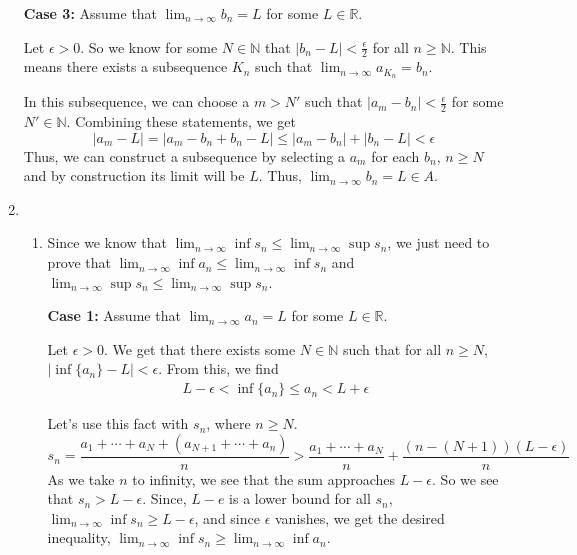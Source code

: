 \documentclass[12pt]{article}
\begin{document}
\begin{enumerate}[start=1,label={\bfseries Problem \arabic*:},leftmargin=1in]
    \textbf{Case 3:} Assume that $\lim_{n \to \infty} b_{n} = L$ for some $L \in \mathbb{R}$. 

    Let $\epsilon > 0$. So we know for some $N \in \mathbb{N}$ that $|b_{n} - L| < \frac{\epsilon}{2}$ for all $n \geq \mathbb{N}$. 
    This means there exists a subsequence $K_{n}$ such that $\lim_{n \to \infty}a_{K_{n}} = b_{n}$. 

    In this subsequence, we can choose a $m > N'$ such that $|a_{m} - b_{n}| < \frac{\epsilon}{2}$ for some $N' \in \mathbb{N}$. 
    Combining these statements, we get 
    \[
        \left| a_{m} - L \right| = \left| a_{m} - b_{n} + b_{n} - L \right| \leq \left| a_{m} - b_{n} \right| + \left| b_{n} - L \right| < \epsilon  
    \]
    Thus, we can construct a subsequence by selecting a $a_{m}$ for each $b_{n}$, $n \geq N$ and by construction its limit will be $L$.
    Thus, $\lim_{n \to \infty} b_{n} = L \in A$. 

    \item 
    \begin{enumerate}
        \item Since we know that $\lim_{n \to \infty} \inf s_{n} \leq \lim_{n \to \infty} \sup s_{n}$, we just need to prove that $\lim_{n \to \infty} \inf a_{n} \leq \lim_{n \to \infty} \inf s_{n}$ and $\lim_{n \to \infty} \sup s_{n} \leq \lim_{n \to \infty} \sup s_{n}$. 
    
        \textbf{Case 1:} Assume that $\lim_{n \to \infty} a_{n} = L$ for some $L \in \mathbb{R}$. 
    
        Let $\epsilon > 0$. We get that there exists some $N \in \mathbb{N}$ such that for all $n \geq N$, $\left| \inf \{ a_{n} \} - L \right| < \epsilon$. 
        From this, we find 
        \begin{align*}
            L - \epsilon < \inf\{a_{n} \} \leq a_{n} < L + \epsilon
        \end{align*}
    
        Let's use this fact with $s_{n}$, where $n \geq N$. 
        \[ 
        s_{n} = \frac{a_{1} + \cdots + a_{N} + (a_{N+1} + \cdots + a_{n})}{n} > \frac{a_{1} + \cdots + a_{N}}{n} + \frac{(n - (N+1))(L- \epsilon)}{n}
        \]
        As we take $n$ to infinity, we see that the sum approaches $L-\epsilon$. So we see that $s_{n} > L - \epsilon$. 
        Since, $L-e$ is a lower bound for all $s_{n}$, $\lim_{n \to \infty} \inf s_{n} \geq L-\epsilon$, and since $\epsilon$ vanishes, we get the desired inequality, $ \lim_{n \to \infty} \inf s_{n} \geq \lim_{n \to \infty} \inf a_{n}$. 
        

\end{enumerate}
\end{enumerate}
\end{document}
